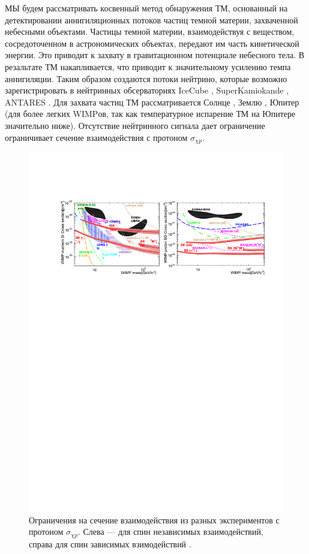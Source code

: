 МЫ будем рассматривать косвенный метод обнаружения ТМ, основанный на детектировании аннигиляционных потоков частиц темной материи, захваченной небесными объектами. Частицы темной материи, взаимодействуя с веществом, сосредоточенном в астрономических объектах, передают им часть кинетической энергии. Это приводит к захвату в гравитационном потенциале небесного тела. В резальтате ТМ накапливается, что приводит к значительному усилению темпа аннигиляции. Таким образом создаются потоки нейтрино, которые возможно зарегистрировать в нейтринных обсерваториях  IceCube \cite{Aartsen_2017}, SuperKamiokande \cite{kamiokandecollaboration2015search}, ANTARES \cite{ADRIANMARTINEZ201669}. Для захвата частиц ТМ рассматривается Солнце \cite{1985ApJ...296..679P}, Землю \cite{1987ApJ...321..571G}, Юпитер \cite{10.1103/physrevd.106.115037} (для более легких WIMPов, так как температурное испарение ТМ на Юпитере значительно ниже). Отсутствие нейтринного сигнала дает ограничение ограничивает сечение взаимодействия с протоном $\sigma_{\chi p}$.

\begin{figure}[htb]
	\begin{center}
		\includegraphics[scale=0.9]{images/SK_graphs.pdf}
		\caption{Ограничения на сечение взаимодействия из разных экспериментов с протоном $\sigma_{\chi p}$. Слева --- для спин независимых взаимодействий, справа для спин зависимых взимодействий \cite{kamiokandecollaboration2015search}.}
	\end{center}
\end{figure}

